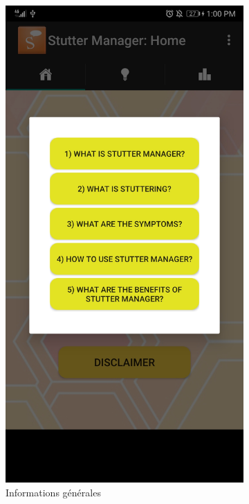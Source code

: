 \begin{appendices}
\begin{landscape}
\begin{figure}[h]
\begin{subfigure}{.25\textwidth}
    \includegraphics[width=.75\linewidth]{content/imgs/old_app_2.jpg}
    \caption{Informations générales}
  \end{subfigure}%
  \begin{subfigure}{.25\textwidth}
    \centering

\end{subfigure}
\end{figure}
\end{landscape}
\end{appendices}
